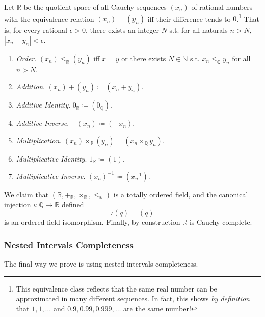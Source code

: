     \begin{theorem}
      Let $\mathbb{R}$ be the quotient space of all Cauchy sequences $(x_n)$ of rational numbers with the equivalence relation $(x_n) = (y_n)$ iff their difference tends to $0$.\footnote{This equivalence class reflects that the same real number can be approximated in many different sequences. In fact, this shows \textit{by definition} that $1, 1, \ldots$ and $0.9, 0.99, 0.999, \ldots$ are the same number!} That is, for every rational $\epsilon > 0$, there exists an integer $N$ s.t. for all naturals $n > N$, $|x_n - y_n| < \epsilon$. 
      \begin{enumerate}
        \item \textit{Order}. $(x_n) \leq_{\mathbb{R}} (y_n)$ iff $x = y$ or there exists $N \in \mathbb{N}$ s.t. $x_n \leq_{\mathbb{Q}} y_n$ for all $n > N$. 
        \item \textit{Addition}. $(x_n) + (y_n) \coloneqq (x_n + y_n)$. 
        \item \textit{Additive Identity}. $0_{\mathbb{R}} \coloneqq (0_{\mathbb{Q}})$. 
        \item \textit{Additive Inverse}. $-(x_n) \coloneqq (-x_n)$. 
        \item \textit{Multiplication}. $(x_n) \times_{\mathbb{R}} (y_n) = (x_n \times_{\mathbb{Q}} y_n)$. 
        \item \textit{Multiplicative Identity}. $1_{\mathbb{R}} \coloneqq (1)$. 
        \item \textit{Multiplicative Inverse}. $(x_n)^{-1} \coloneqq (x_n^{-1})$. 
      \end{enumerate}
      We claim that $(\mathbb{R}, +_{\mathbb{R}}, \times_{\mathbb{R}}, \leq_{\mathbb{R}})$ is a totally ordered field, and the canonical injection $\iota: \mathbb{Q} \rightarrow \mathbb{R}$ defined 
      \begin{equation}
        \iota(q) = (q)
      \end{equation} 
      is an ordered field isomorphism. Finally, by construction $\mathbb{R}$ is Cauchy-complete. 
    \end{theorem}

  \subsubsection{Nested Intervals Completeness} 

    The final way we prove is using nested-intervals completeness.  

